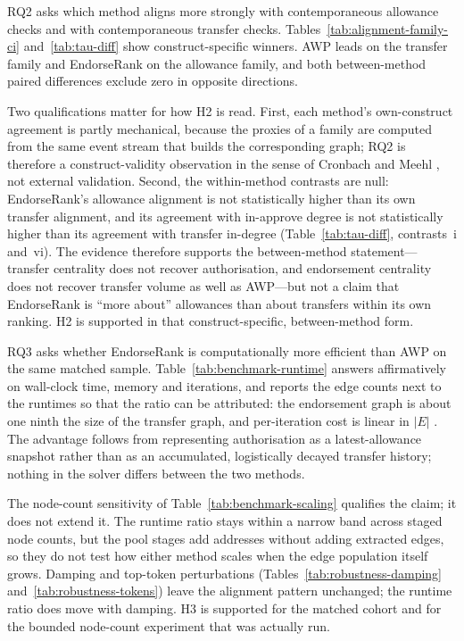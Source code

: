 
RQ2 asks which method aligns more strongly with contemporaneous allowance checks and with contemporaneous transfer checks. Tables~\ref{tab:alignment-family-ci} and~\ref{tab:tau-diff} show construct-specific winners. AWP leads on the transfer family and EndorseRank on the allowance family, and both between-method paired differences exclude zero in opposite directions.

Two qualifications matter for how H2 is read. First, each method's own-construct agreement is partly mechanical, because the proxies of a family are computed from the same event stream that builds the corresponding graph; RQ2 is therefore a construct-validity observation in the sense of Cronbach and Meehl , not external validation. Second, the within-method contrasts are null: EndorseRank's allowance alignment is not statistically higher than its own transfer alignment, and its agreement with in-approve degree is not statistically higher than its agreement with transfer in-degree (Table~\ref{tab:tau-diff}, contrasts~i and~vi). The evidence therefore supports the between-method statement---transfer centrality does not recover authorisation, and endorsement centrality does not recover transfer volume as well as AWP---but not a claim that EndorseRank is ``more about'' allowances than about transfers within its own ranking. H2 is supported in that construct-specific, between-method form.


RQ3 asks whether EndorseRank is computationally more efficient than AWP on the same matched sample. Table~\ref{tab:benchmark-runtime} answers affirmatively on wall-clock time, memory and iterations, and reports the edge counts next to the runtimes so that the ratio can be attributed: the endorsement graph is about one ninth the size of the transfer graph, and per-iteration cost is linear in $|E|$ . The advantage follows from representing authorisation as a latest-allowance snapshot rather than as an accumulated, logistically decayed transfer history; nothing in the solver differs between the two methods.

The node-count sensitivity of Table~\ref{tab:benchmark-scaling} qualifies the claim; it does not extend it. The runtime ratio stays within a narrow band across staged node counts, but the pool stages add addresses without adding extracted edges, so they do not test how either method scales when the edge population itself grows. Damping and top-token perturbations (Tables~\ref{tab:robustness-damping} and~\ref{tab:robustness-tokens}) leave the alignment pattern unchanged; the runtime ratio does move with damping. H3 is supported for the matched cohort and for the bounded node-count experiment that was actually run.

